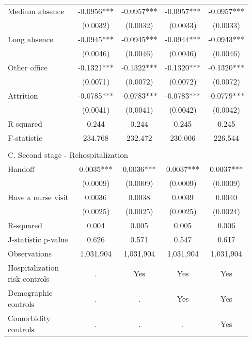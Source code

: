 \documentclass[final,12pt, notitlepage]{article}
\begin{document}
\begin{singlespace}
\begin{table}[H]
\begin{threeparttable}
{\begin{tabular*}{\textwidth}{l@{\extracolsep{\fill}}*{4}{c}}
Medium absence      &     -0.0956***&     -0.0957***&     -0.0957***&     -0.0957***\\
                    &    (0.0032)   &    (0.0032)   &    (0.0033)   &    (0.0033)   \\
Long absence        &     -0.0945***&     -0.0945***&     -0.0944***&     -0.0943***\\
                    &    (0.0046)   &    (0.0046)   &    (0.0046)   &    (0.0046)   \\
Other office        &     -0.1321***&     -0.1322***&     -0.1320***&     -0.1320***\\
                    &    (0.0071)   &    (0.0072)   &    (0.0072)   &    (0.0072)   \\
Attrition           &     -0.0785***&     -0.0783***&     -0.0783***&     -0.0779***\\
                    &    (0.0041)   &    (0.0041)   &    (0.0042)   &    (0.0042)   \\
R-squared           &       0.244   &       0.244   &       0.245   &       0.245   \\
F-statistic         &     234.768   &     232.472   &     230.006   &     226.544   \\
\\
\multicolumn{5}{l}{C. Second stage - Rehospitalization} \\
Handoff             &      0.0035***&      0.0036***&      0.0037***&      0.0037***\\
                    &    (0.0009)   &    (0.0009)   &    (0.0009)   &    (0.0009)   \\
Have a nurse visit  &      0.0036   &      0.0038   &      0.0039   &      0.0040   \\
                    &    (0.0025)   &    (0.0025)   &    (0.0025)   &    (0.0024)   \\
R-squared           &       0.004   &       0.005   &       0.005   &       0.006   \\
J-statistic p-value &       0.626   &       0.571   &       0.547   &       0.617   \\
\midrule
Observations        &     1,031,904   &     1,031,904   &     1,031,904   &     1,031,904   \\
Hospitalization risk controls & . & Yes & Yes & Yes \\
Demographic controls & . & . & Yes & Yes \\
 Comorbidity controls & . & . & . & Yes \\
\bottomrule
\end{tabular*}
}
\end{threeparttable}
\end{table}
\end{singlespace}
\end{document}
